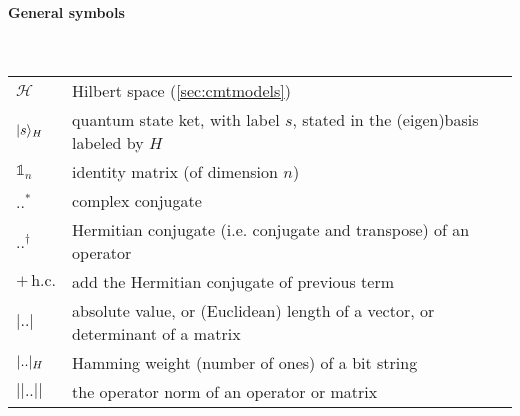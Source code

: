 {\footnotesize

\renewcommand{\arraystretch}{1.2}


\paragraph{General symbols}  \mbox{} \\[5pt]
%
%
\begin{tabular}{ll}
$\mathcal{H}$ 		& Hilbert space (\cref{sec:cmtmodels}) \\
$\lvert s \rangle_{H}$		& quantum state ket, with label $s$, stated in the (eigen)basis labeled by $H$ \\
$\mathds{1}_n$ & identity matrix (of dimension $n$) \\
$..^*$ & complex conjugate \\
$..^\dagger$ & Hermitian conjugate (i.e. conjugate and transpose) of an operator\\
$ + \, \text{h.c.}$ & add the Hermitian conjugate of previous term \\
$|..|$ & absolute value, or (Euclidean) length of a vector, or determinant of a matrix \\
${ |..|_{H} }$ & Hamming weight (number of ones) of a bit string \\
$||..||$ & the operator norm of an operator or matrix
\end{tabular}

}

